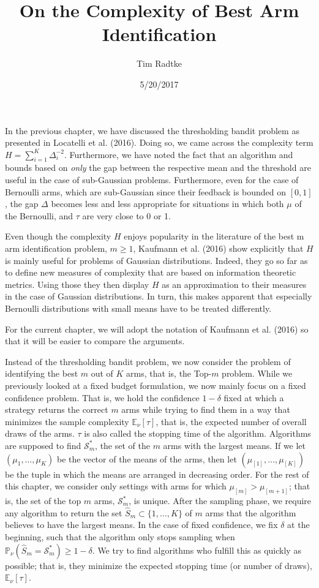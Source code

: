 \documentclass[12pt,]{article}
\title{On the Complexity of Best Arm Identification}
\author{Tim Radtke}
\date{5/20/2017}
\begin{document}
\maketitle

In the previous chapter, we have discussed the thresholding bandit
problem as presented in Locatelli et al. (2016). Doing so, we came
across the complexity term \(H = \sum_{i=1}^{K} \Delta_i^{-2}\).
Furthermore, we have noted the fact that an algorithm and bounds based
on \emph{only} the gap between the respective mean and the threshold are
useful in the case of sub-Gaussian problems. Furthermore, even for the
case of Bernoulli arms, which are sub-Gaussian since their feedback is
bounded on \([0,1]\), the gap \(\Delta\) becomes less and less
appropriate for situations in which both \(\mu\) of the Bernoulli, and
\(\tau\) are very close to 0 or 1.

Even though the complexity \(H\) enjoys popularity in the literature of
the best m arm identification problem, \(m \geq 1\), Kaufmann et al.
(2016) show explicitly that \(H\) is mainly useful for problems of
Gaussian distributions. Indeed, they go so far as to define new measures
of complexity that are based on information theoretic metrics. Using
those they then display \(H\) as an approximation to their measures in
the case of Gaussian distributions. In turn, this makes apparent that
especially Bernoulli distributions with small means have to be treated
differently.

For the current chapter, we will adopt the notation of Kaufmann et al.
(2016) so that it will be easier to compare the arguments.

Instead of the thresholding bandit problem, we now consider the problem
of identifying the best \(m\) out of \(K\) arms, that is, the Top-\(m\)
problem. While we previously looked at a fixed budget formulation, we
now mainly focus on a fixed confidence problem. That is, we hold the
confidence \(1-\delta\) fixed at which a strategy returns the correct
\(m\) arms while trying to find them in a way that minimizes the sample
complexity \(\mathbb{E}_{\nu}[\tau]\), that is, the expected number of
overall draws of the arms. \(\tau\) is also called the stopping time of
the algorithm. Algorithms are supposed to find \(\mathcal{S}_m^*\), the
set of the \(m\) arms with the largest means. If we let
\((\mu_1, \dots, \mu_K)\) be the vector of the means of the arms, then
let \((\mu_{[1]}, \dots, \mu_{[K]})\) be the tuple in which the means
are arranged in decreasing order. For the rest of this chapter, we
consider only settings with arms for which \(\mu_{[m]} > \mu_{[m+1]}\);
that is, the set of the top \(m\) arms, \(\mathcal{S}_m^*\), is unique.
After the sampling phase, we require any algorithm to return the set
\(\hat{S}_m \subset \{1,\dots,K\}\) of \(m\) arms that the algorithm
believes to have the largest means. In the case of fixed confidence, we
fix \(\delta\) at the beginning, such that the algorithm only stops
sampling when
\(\mathbb{P}_{\nu}(\hat{S}_m = \mathcal{S}_m^*) \geq 1-\delta\). We try
to find algorithms who fulfill this as quickly as possible; that is,
they minimize the expected stopping time (or number of draws),
\(\mathbb{E}_{\nu}[\tau]\).
\end{document}
